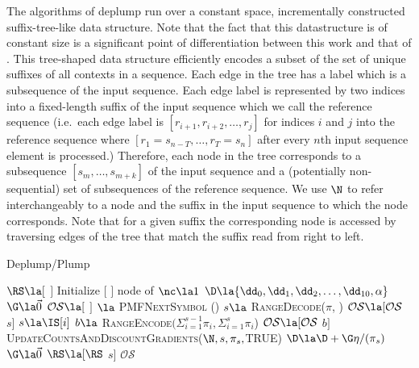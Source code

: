 The algorithms of deplump run over a constant space, incrementally constructed suffix-tree-like data structure.  Note that the fact that this datastructure is of constant size is a significant point of  differentiation between this work and that of \cite{Gasthaus2010}. This tree-shaped data structure efficiently encodes a subset of the set of unique suffixes of all contexts in a sequence.  Each edge in the tree has a label which is a subsequence of the input sequence.  Each edge label is represented by two indices into a fixed-length suffix of the input sequence which we call the reference sequence (i.e.~each edge label is $[r_{i+1}, r_{i+2}, \ldots,r_{j}]$ for indices $i$ and $j$ into the reference sequence where $[r_{1} = s_{n-T}, \ldots, r_T = s_n]$ after every $n$th input sequence element is processed.)  
Therefore, each node in the tree corresponds to a subsequence $[s_m, \ldots, s_{m + k}]$ of the input sequence and a (potentially non-sequential) set of subsequences of the reference sequence.  
We use $\N$ to refer interchangeably to a node and the suffix in the input sequence to which the node corresponds.  Note that for a given suffix the corresponding node is accessed by traversing edges of the tree that match the suffix read from right to left. 

\begin{algorithm}[t]
    \caption{Deplump/Plump} \label{alg:deplump/plump}
    \begin{algorithmic}[1]
		\State $\RS \la [$ $]  $ 
		\State Initialize $[$ $]$ node of \T {}
		\State $\nc \la 1$ 
		\State $\D \la  \{ \dd_0, \dd_1, \dd_2, \dots, \dd_{10}, \alpha \}$ 
		\State $\G \la \vec 0$ 
		\State $\mathcal{O}\mathcal{S} \la  [$ $]$ 
			\State [$\pi$, \N] $\la$ \textsc{PMFNextSymbol} (\RS)
				\State $s \la $ \textsc{RangeDecode}($\pi$, \IS)
				\State $\mathcal{O}\mathcal{S} \la [\mathcal{O}\mathcal{S}$ $s]$
			\Else
				\State $s \la \IS[i]$
				\State $b \la$ \textsc{RangeEncode}$(\Sigma_{i = 1}^{s-1} \pi_i, \Sigma_{i = 1}^{s} \pi_i$)
				\State $\mathcal{O}\mathcal{S} \la [\mathcal{O}\mathcal{S}$ $b]$		
			\EndIf
			\State \textsc{UpdateCountsAndDiscountGradients}($\N,s,\pi_s,$TRUE)
			\State $\D \la \D + \G \eta / (\pi_s)$ 
			\State $\G \la \vec 0$ 
			\State $\RS \la [\RS$ $s]$ 
		\EndFor
		\State \Return $\mathcal{O}\mathcal{S}$
	\EndProcedure
	\end{algorithmic}
\end{algorithm}


